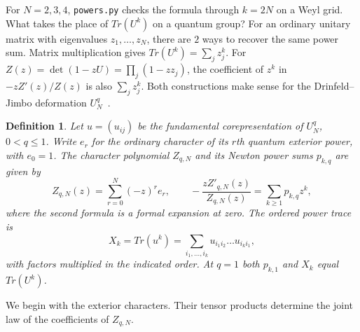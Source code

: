\documentclass[11pt,a4paper]{article}
\newtheorem{defn}[thm]{Definition}
\begin{document}
For $N=2,3,4$, \texttt{powers.py} checks the formula through $k=2N$ on a Weyl grid. What takes the place of $Tr(U^k)$ on a quantum group? For an ordinary unitary matrix with eigenvalues $z_1,\ldots,z_N$, there are $2$ ways to recover the same power sum. Matrix multiplication gives $Tr(U^k)=\sum_j z_j^k$. For $Z(z)=\det(1-zU)=\prod_j(1-zz_j)$, the coefficient of $z^k$ in $-zZ'(z)/Z(z)$ is also $\sum_j z_j^k$. Both constructions make sense for the Drinfeld--Jimbo deformation $U_N^q$~\cite{drinfeld,jimbo}.

\begin{samepage}
\begin{defn}
Let $u=(u_{ij})$ be the fundamental corepresentation of $U_N^q$, $0<q\leq1$. Write $e_r$ for the ordinary character of its $r$th quantum exterior power, with $e_0=1$. The character polynomial $Z_{q,N}$ and its Newton power sums $p_{k,q}$ are given by
\[
 Z_{q,N}(z)=\sum_{r=0}^N(-z)^r e_r,\qquad
 -\frac{zZ'_{q,N}(z)}{Z_{q,N}(z)}=\sum_{k\geq1}p_{k,q}z^k,
\]
where the second formula is a formal expansion at zero. The ordered power trace is
\[
 X_k=Tr(u^k)=\sum_{i_1,\ldots,i_k}u_{i_1i_2}\ldots u_{i_ki_1},
\]
with factors multiplied in the indicated order. At $q=1$ both $p_{k,1}$ and $X_k$ equal $Tr(U^k)$.
\end{defn}
\end{samepage}

We begin with the exterior characters. Their tensor products determine the joint law of the coefficients of $Z_{q,N}$.
\end{document}
